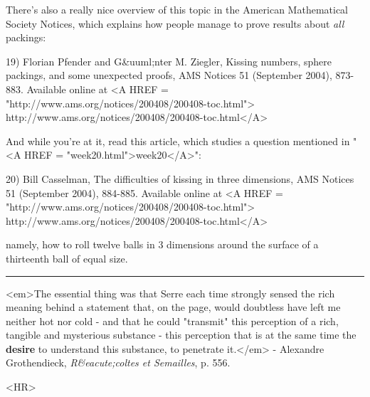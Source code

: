 There's also a really nice overview of this topic in the 
American Mathematical Society Notices, which explains how
people manage to prove results about \emph{all} packings:

19) Florian Pfender and G&uuml;nter M. Ziegler, 
Kissing numbers, sphere packings, and some unexpected
proofs, AMS Notices 51 (September 2004), 873-883.
Available online at 
<A HREF = "http://www.ams.org/notices/200408/200408-toc.html">
http://www.ams.org/notices/200408/200408-toc.html</A>

And while you're at it, read this article, which
studies a question mentioned
in "<A HREF = "week20.html">week20</A>":

20) Bill Casselman, The difficulties of kissing in three 
dimensions, AMS Notices 51 (September 2004), 884-885.
Available online at <A HREF = "http://www.ams.org/notices/200408/200408-toc.html">
http://www.ams.org/notices/200408/200408-toc.html</A>

namely, how to roll twelve balls in 3 dimensions around the surface 
of a thirteenth ball of equal size. 


\par\noindent\rule{\textwidth}{0.4pt}
<em>The essential thing was that Serre each time strongly sensed
the rich meaning behind a statement that, on the page, would doubtless
have left me neither hot nor cold - and that he could "transmit"
this perception of a rich, tangible and mysterious substance - this
perception that is at the same time the \textbf{desire} to understand
this substance, to penetrate it.</em> - Alexandre Grothendieck, 
\emph{R&eacute;coltes et Semailles}, p. 556.
 
<HR>



